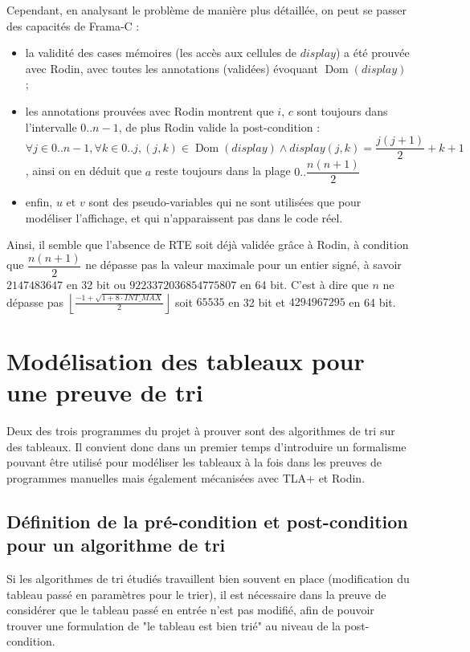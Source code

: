 \documentclass[a4paper, 11pt]{article}
\DeclareMathOperator{\ddom}{Dom}
\newcommand{\dom}[1]{\ddom\left(#1\right)}
\theoremstyle{mystyle}
\begin{document}
Cependant, en analysant le problème de manière plus détaillée, on peut se passer des capacités de Frama-C :
\begin{itemize}
    \item la validité des cases mémoires (les accès aux cellules de $display$) a été prouvée avec Rodin, avec toutes les annotations (validées) évoquant $\dom{display}$ ;
    \item les annotations prouvées avec Rodin montrent que $i$, $c$ sont toujours dans l'intervalle $0..n - 1$, de plus Rodin valide la post-condition : $\forall j \in 0..n-1, \forall k \in 0..j, (j, k) \in \dom{display} \land display(j, k) = \dfrac{j(j+1)}{2} + k + 1$, ainsi on en déduit  que $a$ reste toujours dans la plage $0..\dfrac{n(n+1)}{2}$
    \item enfin, $u$ et $v$ sont des pseudo-variables qui ne sont utilisées que pour modéliser l'affichage, et qui n'apparaissent pas dans le code réel.
\end{itemize}
Ainsi, il semble que l'absence de RTE soit déjà validée grâce à Rodin, à condition que $\dfrac{n(n+1)}{2}$ ne dépasse pas la valeur maximale pour un entier signé, à savoir $2147483647$ en 32 bit ou $9223372036854775807$ en 64 bit. C'est à dire que $n$ ne dépasse pas $\left\lfloor\frac{-1+\sqrt{1 + 8 \cdot INT\_MAX}}{2}\right\rfloor$ soit $65535$ en 32 bit et $4294967295$ en 64 bit.

\clearpage\section{Modélisation des tableaux pour une preuve de tri}

Deux des trois programmes du projet à prouver sont des algorithmes de tri sur des tableaux. Il convient donc dans un premier temps d'introduire un formalisme pouvant être utilisé pour modéliser les tableaux à la fois dans les preuves de programmes manuelles mais également mécanisées avec TLA+ et Rodin.

\subsection{Définition de la pré-condition et post-condition pour un algorithme de tri}

Si les algorithmes de tri étudiés travaillent bien souvent en place (modification du tableau passé en paramètres pour le trier), il est nécessaire dans la preuve de considérer que le tableau passé en entrée n'est pas modifié, afin de pouvoir trouver une formulation de "le tableau est bien trié" au niveau de la post-condition.
\end{document}
